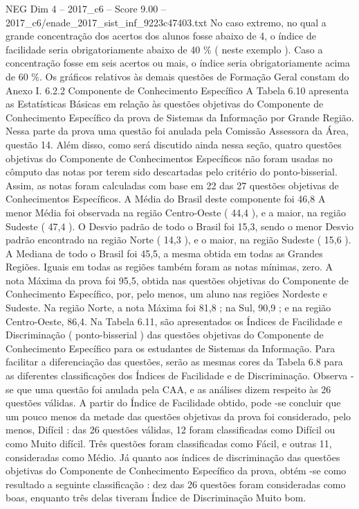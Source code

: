 \begin{textsample}{NEG Dim 4 – 2017\_c6 – Score 9.00 – 2017\_c6/enade\_2017\_sist\_inf\_9223c47403.txt}
No caso extremo, no qual a grande concentração dos acertos dos alunos fosse abaixo de 4, o índice de facilidade seria obrigatoriamente abaixo de 40 \% ( neste exemplo ).
Caso a concentração fosse em seis acertos ou mais, o índice seria obrigatoriamente acima de 60 \%.
Os gráficos relativos às demais questões de Formação Geral constam do Anexo I. 6.2.2 Componente de Conhecimento Específico A Tabela 6.10 apresenta as Estatísticas Básicas em relação às questões objetivas do Componente de Conhecimento Específico da prova de Sistemas da Informação por Grande Região.
Nessa parte da prova uma questão foi anulada pela Comissão Assessora da Área, questão 14.
Além disso, como será discutido ainda nessa seção, quatro questões objetivas do Componente de Conhecimentos Específicos não foram usadas no cômputo das notas por terem sido descartadas pelo critério do ponto-bisserial.
Assim, as notas foram calculadas com base em 22 das 27 questões objetivas de Conhecimentos Específicos.
A Média do Brasil deste componente foi 46,8 A menor Média foi observada na região Centro-Oeste ( 44,4 ), e a maior, na região Sudeste ( 47,4 ).
O Desvio padrão de todo o Brasil foi 15,3, sendo o menor Desvio padrão encontrado na região Norte ( 14,3 ), e o maior, na região Sudeste ( 15,6 ).
A Mediana de todo o Brasil foi 45,5, a mesma obtida em todas as Grandes Regiões.
Iguais em todas as regiões também foram as notas mínimas, zero.
A nota Máxima da prova foi 95,5, obtida nas questões objetivas do Componente de Conhecimento Específico, por, pelo menos, um aluno nas regiões Nordeste e Sudeste.
Na região Norte, a nota Máxima foi 81,8 ; na Sul, 90,9 ; e na região Centro-Oeste, 86,4.
Na Tabela 6.11, são apresentados os Índices de Facilidade e Discriminação ( ponto-bisserial ) das questões objetivas do Componente de Conhecimento Específico para os estudantes de Sistemas da Informação.
Para facilitar a diferenciação das questões, serão as mesmas cores da Tabela 6.8 para as diferentes classificações dos Índices de Facilidade e de Discriminação.
Observa -se que uma questão foi anulada pela CAA, e as análises dizem respeito às 26 questões válidas.
A partir do Índice de Facilidade obtido, pode -se concluir que um pouco menos da metade das questões objetivas da prova foi considerado, pelo menos, Difícil : das 26 questões válidas, 12 foram classificadas como Difícil ou como Muito difícil.
Três questões foram classificadas como Fácil, e outras 11, consideradas como Médio.
Já quanto aos índices de discriminação das questões objetivas do Componente de Conhecimento Específico da prova, obtém -se como resultado a seguinte classificação : dez das 26 questões foram consideradas como boas, enquanto três delas tiveram Índice de Discriminação Muito bom.

\end{textsample}
